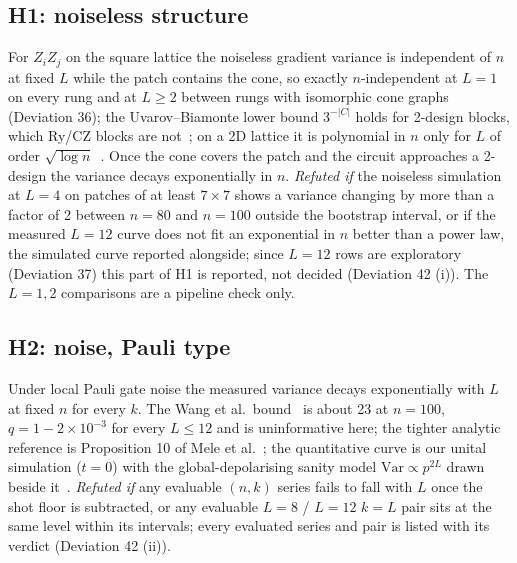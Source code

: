 \documentclass[aps,prxquantum,reprint,superscriptaddress,nofootinbib,longbibliography,amsmath,amssymb]{revtex4-2}
\newcommand{\Var}{\mathrm{Var}}
\begin{document}
\subsection{H1: noiseless structure}
For $Z_iZ_j$ on the square lattice the noiseless gradient variance is independent of $n$ at fixed $L$ while the patch contains the cone, so exactly $n$-independent at $L = 1$ on every rung and at $L \geq 2$ between rungs with isomorphic cone graphs (Deviation 36); the Uvarov--Biamonte lower bound $3^{-|C|}$ holds for 2-design blocks, which Ry/CZ blocks are not~\cite{Uvarov2021}; on a 2D lattice it is polynomial in $n$ only for $L$ of order $\sqrt{\log n}$~\cite{Cerezo2021}. Once the cone covers the patch and the circuit approaches a 2-design the variance decays exponentially in $n$. \emph{Refuted if} the noiseless simulation at $L = 4$ on patches of at least $7\times7$ shows a variance changing by more than a factor of 2 between $n = 80$ and $n = 100$ outside the bootstrap interval, or if the measured $L = 12$ curve does not fit an exponential in $n$ better than a power law, the simulated curve reported alongside; since $L = 12$ rows are exploratory (Deviation 37) this part of H1 is reported, not decided (Deviation 42 (i)). The $L = 1, 2$ comparisons are a pipeline check only.

\subsection{H2: noise, Pauli type}
Under local Pauli gate noise the measured variance decays exponentially with $L$ at fixed $n$ for every $k$. The Wang et al.\ bound~\cite{Wang2021} is about 23 at $n = 100$, $q = 1 - 2\times10^{-3}$ for every $L \leq 12$ and is uninformative here; the tighter analytic reference is Proposition 10 of Mele et al.~\cite{Mele2026}; the quantitative curve is our unital simulation ($t = 0$) with the global-depolarising sanity model $\Var \propto p^{2L}$ drawn beside it~\cite{KimOz2022}. \emph{Refuted if} any evaluable $(n, k)$ series fails to fall with $L$ once the shot floor is subtracted, or any evaluable $L = 8$ / $L = 12$ $k = L$ pair sits at the same level within its intervals; every evaluated series and pair is listed with its verdict (Deviation 42 (ii)).
\end{document}
